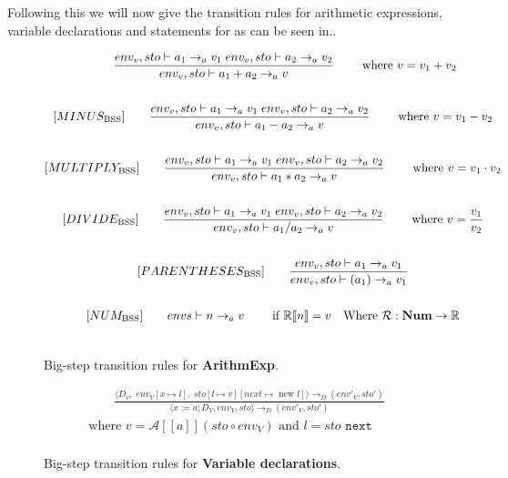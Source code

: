 Following this we will now give the transition rules for arithmetic expressions, variable declarations and statements for \dazel{} as can be seen in..

\begin{figure}[htbp]
	\centering
	\begin{gather*}
		[PLUS_\text{BSS}] 
		\qquad \dfrac
		{\envs \vdash a_1 \rightarrow_a v_1 \; \envs \vdash a_2 \rightarrow_a v_2}
		{\envs \vdash a_1 + a_2 \rightarrow_a v}
		\qquad \text{ where }v = v_1 + v_2
		\\
		\\
		[MINUS_\text{BSS}] 
		\qquad \dfrac
		{\envs \vdash a_1 \rightarrow_a v_1 \; \envs \vdash a_2 \rightarrow_a v_2}
		{\envs \vdash a_1 - a_2 \rightarrow_a v}
		\qquad \text{ where }v = v_1 - v_2
		\\
		\\
		[MULTIPLY_\text{BSS}] 
		\qquad \dfrac
		{\envs \vdash a_1 \rightarrow_a v_1 \; \envs \vdash a_2 \rightarrow_a v_2}
		{\envs \vdash a_1 * a_2 \rightarrow_a v}
		\qquad \text{ where }v = v_1 \cdot v_2
		\\
		\\
		[DIVIDE_\text{BSS}] 
		\qquad \dfrac
		{\envs \vdash a_1 \rightarrow_a v_1 \; \envs \vdash a_2 \rightarrow_a v_2}
		{\envs \vdash a_1 / a_2 \rightarrow_a v}
		\qquad \text{ where }v = \dfrac{v_1}{v_2}
		\\
		\\
		[PARENTHESES_\text{BSS}] 
		\qquad \dfrac
		{\envs \vdash a_1 \rightarrow_a v_1}
		{\envs \vdash (a_1) \rightarrow_a v_1}
		\\
		\\
		[NUM_\text{BSS}] 
		\qquad envs \vdash n \rightarrow_a v
		\qquad \text{ if } \mathbb{R}[\![n]\!] = v \quad \text{Where } \mathcal{R}:\textbf{Num}\rightarrow \mathbb{R}
		\\
		\\
	\end{gather*}
	\caption{Big-step transition rules for \textbf{ArithmExp}.}
	\label{fig:BssArithm}
\end{figure}

\begin{figure}[htbp]
	\centering
	\begin{gather*}
		[VAR_\text{BSS}]
		\qquad 
		\frac
		{\langle D_v,\; env_V[x \mapsto l], \; sto[l \mapsto v][next \mapsto \text{ new } l]\rangle \rightarrow_D (env'_V, sto')}
		{\langle x:=a; D_V, env_V, sto \rangle \rightarrow_D (env'_V, sto')} \\
		\text{where } v = \mathcal{A}[\![a]\!](sto\circ env_V ) \text{ and } l = \textit{sto } \texttt{next}
		\\
	\end{gather*}
	\caption{Big-step transition rules for \textbf{Variable declarations}.}
	\label{fig:BssStm}
\end{figure}

